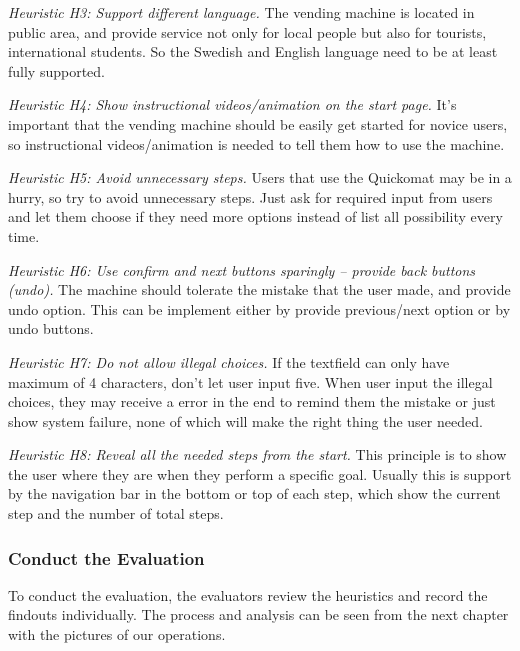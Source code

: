 \documentclass[twocolumn]{article}
\begin{document}
\emph{Heuristic H3: Support different language.} The vending machine is located in public area, and provide service not only for local people but also for tourists, international students. So the Swedish and English language need to be at least fully supported.

\emph{Heuristic H4: Show instructional videos/animation on the start page.} It’s important that the vending machine should be easily get started for novice users, so instructional videos/animation is needed to tell them how to use the machine.

\emph{Heuristic H5: Avoid unnecessary steps.} Users that use the Quickomat may be in a hurry, so try to avoid unnecessary steps. Just ask for required input from users and let them choose if they need more options instead of list all possibility every time.

\emph{Heuristic H6: Use confirm and next buttons sparingly -- provide back buttons (undo).} The machine should tolerate the mistake that the user made, and provide undo option. This can be implement either by provide previous/next option or by undo buttons.

\emph{Heuristic H7: Do not allow illegal choices.} If the textfield can only have maximum of 4 characters, don’t let user input five. When user input the illegal choices, they may receive a error in the end to remind them the mistake or just show system failure, none of which will make the right thing the user needed.

\emph{Heuristic H8: Reveal all the needed steps from the start.} This principle is to show the user where they are when they perform a specific goal. Usually this is support by the navigation bar in the bottom or top of each step, which show the current step and the number of total steps.

\subsubsection{Conduct the Evaluation}
To conduct the evaluation, the evaluators review the heuristics and record the findouts individually. The process and analysis can be seen from the next chapter with the pictures of our operations.
\end{document}
